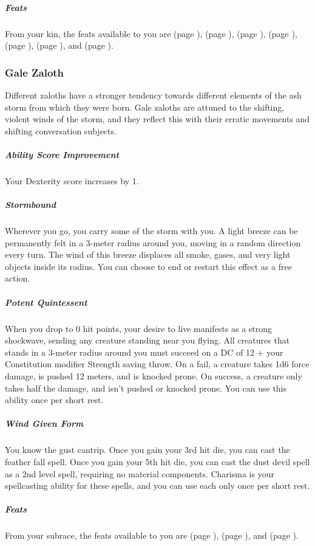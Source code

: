     \subparagraph{Feats} From your kin, the feats available to you are
    \textbf{} (page \pageref{feat::}),
    \textbf{} (page \pageref{feat::}),
    \textbf{} (page \pageref{feat::}),
    \textbf{} (page \pageref{feat::}),
    \textbf{} (page \pageref{feat::}),
    \textbf{} (page \pageref{feat::}), and
    \textbf{} (page \pageref{feat::}).

\subsubsection{Gale Zaloth}
    Different zaloths have a stronger tendency towards different elements of the ash storm from which they were born.
    Gale zaloths are attuned to the shifting, violent winds of the storm, and they reflect this with their erratic movements and shifting conversation subjects.

    \subparagraph{Ability Score Improvement} Your Dexterity score increases by 1.

    \subparagraph{Stormbound} Wherever you go, you carry some of the storm with you.
    A light breeze can be permanently felt in a 3-meter radius around you, moving in a random direction every turn.
    The wind of this breeze displaces all smoke, gases, and very light objects inside its radius.
    You can choose to end or restart this effect as a free action.

    \subparagraph{Potent Quintessent} When you drop to 0 hit points, your desire to live manifests as a strong shockwave, sending any creature standing near you flying.
    All creatures that stands in a 3-meter radius around you must succeed on a DC of 12 + your Constitution modifier Strength saving throw.
    On a fail, a creature takes 1d6 force damage, is pushed 12 meters, and is knocked prone.
    On success, a creature only takes half the damage, and isn't pushed or knocked prone.
    You can use this ability once per short rest.

    \subparagraph{Wind Given Form} You know the gust cantrip.
    Once you gain your 3rd hit die, you can cast the feather fall spell.
    Once you gain your 5th hit die, you can cast the dust devil spell as a 2nd level spell, requiring no material components.
    Charisma is your spellcasting ability for these spells, and you can use each only once per short rest.

    \subparagraph{Feats} From your subrace, the feats available to you are
    \textbf{} (page \pageref{feat::}),
    \textbf{} (page \pageref{feat::}), and
    \textbf{} (page \pageref{feat::}).

